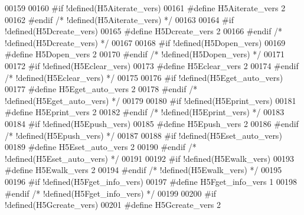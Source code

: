 \begin{DoxyCode}
00159 
00160 \textcolor{preprocessor}{#if !defined(H5Aiterate\_vers)}
00161 \textcolor{preprocessor}{  #define H5Aiterate\_vers 2}
00162 \textcolor{preprocessor}{#endif }\textcolor{comment}{/* !defined(H5Aiterate\_vers) */}\textcolor{preprocessor}{}
00163 
00164 \textcolor{preprocessor}{#if !defined(H5Dcreate\_vers)}
00165 \textcolor{preprocessor}{  #define H5Dcreate\_vers 2}
00166 \textcolor{preprocessor}{#endif }\textcolor{comment}{/* !defined(H5Dcreate\_vers) */}\textcolor{preprocessor}{}
00167 
00168 \textcolor{preprocessor}{#if !defined(H5Dopen\_vers)}
00169 \textcolor{preprocessor}{  #define H5Dopen\_vers 2}
00170 \textcolor{preprocessor}{#endif }\textcolor{comment}{/* !defined(H5Dopen\_vers) */}\textcolor{preprocessor}{}
00171 
00172 \textcolor{preprocessor}{#if !defined(H5Eclear\_vers)}
00173 \textcolor{preprocessor}{  #define H5Eclear\_vers 2}
00174 \textcolor{preprocessor}{#endif }\textcolor{comment}{/* !defined(H5Eclear\_vers) */}\textcolor{preprocessor}{}
00175 
00176 \textcolor{preprocessor}{#if !defined(H5Eget\_auto\_vers)}
00177 \textcolor{preprocessor}{  #define H5Eget\_auto\_vers 2}
00178 \textcolor{preprocessor}{#endif }\textcolor{comment}{/* !defined(H5Eget\_auto\_vers) */}\textcolor{preprocessor}{}
00179 
00180 \textcolor{preprocessor}{#if !defined(H5Eprint\_vers)}
00181 \textcolor{preprocessor}{  #define H5Eprint\_vers 2}
00182 \textcolor{preprocessor}{#endif }\textcolor{comment}{/* !defined(H5Eprint\_vers) */}\textcolor{preprocessor}{}
00183 
00184 \textcolor{preprocessor}{#if !defined(H5Epush\_vers)}
00185 \textcolor{preprocessor}{  #define H5Epush\_vers 2}
00186 \textcolor{preprocessor}{#endif }\textcolor{comment}{/* !defined(H5Epush\_vers) */}\textcolor{preprocessor}{}
00187 
00188 \textcolor{preprocessor}{#if !defined(H5Eset\_auto\_vers)}
00189 \textcolor{preprocessor}{  #define H5Eset\_auto\_vers 2}
00190 \textcolor{preprocessor}{#endif }\textcolor{comment}{/* !defined(H5Eset\_auto\_vers) */}\textcolor{preprocessor}{}
00191 
00192 \textcolor{preprocessor}{#if !defined(H5Ewalk\_vers)}
00193 \textcolor{preprocessor}{  #define H5Ewalk\_vers 2}
00194 \textcolor{preprocessor}{#endif }\textcolor{comment}{/* !defined(H5Ewalk\_vers) */}\textcolor{preprocessor}{}
00195 
00196 \textcolor{preprocessor}{#if !defined(H5Fget\_info\_vers)}
00197 \textcolor{preprocessor}{  #define H5Fget\_info\_vers 1}
00198 \textcolor{preprocessor}{#endif }\textcolor{comment}{/* !defined(H5Fget\_info\_vers) */}\textcolor{preprocessor}{}
00199 
00200 \textcolor{preprocessor}{#if !defined(H5Gcreate\_vers)}
00201 \textcolor{preprocessor}{  #define H5Gcreate\_vers 2}

\end{DoxyCode}
